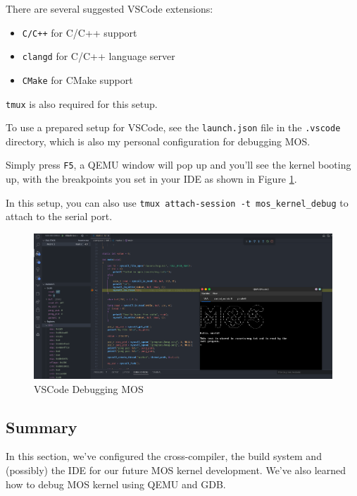 \begin{tip}
    \item There are several suggested VSCode extensions:
    \begin{itemize}
        \item \texttt{C/C++} for C/C++ support
        \item \texttt{clangd} for C/C++ language server
        \item \texttt{CMake} for CMake support
    \end{itemize}
    \item \texttt{tmux} is also required for this setup.
\end{tip}

To use a prepared setup for VSCode, see the \texttt{launch.json} file in the \texttt{.vscode}
directory, which is also my personal configuration for debugging MOS.

Simply press \texttt{F5}, a QEMU window will pop up and you'll see the kernel booting up, with
the breakpoints you set in your IDE as shown in Figure \ref{fig:vscode-debugging}.

In this setup, you can also use \texttt{tmux attach-session -t mos\_kernel\_debug} to attach to the serial
port.

\begin{figure}[ht]
    \centering
    \includegraphics[width=\textwidth]{assets/c1.vscode-debugging.png}
    \caption{VSCode Debugging MOS}
    \label{fig:vscode-debugging}
\end{figure}

\subsection{Summary}

In this section, we've configured the cross-compiler, the build system and (possibly) the IDE for
our future MOS kernel development. We've also learned how to debug MOS kernel using QEMU and GDB.

